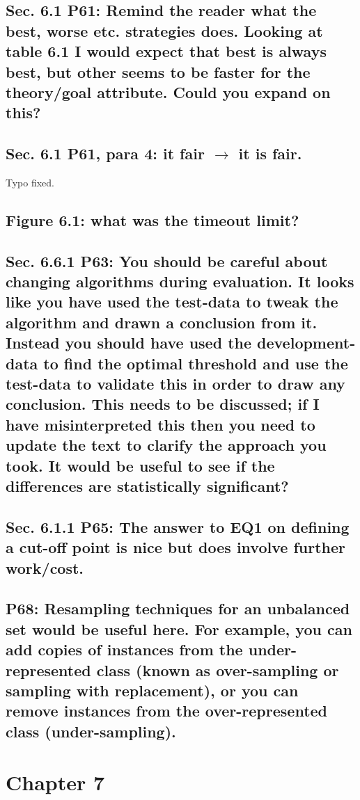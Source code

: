 \documentclass[]{article}
\begin{document}
\subsection{Sec. 6.1 P61: Remind the reader what the best, worse etc. strategies does. Looking at table 6.1 I would expect that best is always best, but other seems to be faster for the theory/goal attribute. Could you expand on this?}

\subsection{Sec. 6.1 P61, para 4: it fair $\rightarrow$ it is fair.}

Typo fixed.

\subsection{Figure 6.1: what was the timeout limit?}

\subsection{Sec. 6.6.1 P63: You should be careful about changing algorithms during evaluation. It looks like you have used the test-data to tweak the algorithm and drawn a conclusion from it. Instead you should have used the development-data to find the optimal threshold and use the test-data to validate this in order to draw any conclusion. This needs to be discussed; if I have	misinterpreted this then you need to update the text to clarify the approach you took. It would be useful to see if the differences are statistically significant?}

\subsection{Sec. 6.1.1 P65: The answer to EQ1 on defining a cut-off point is nice but does involve further work/cost.}

\subsection{P68: Resampling techniques for an unbalanced set would be useful here. For example, you can add copies of instances from the under-represented class (known as over-sampling or sampling with replacement), or you can remove instances from the over-represented class (under-sampling).}

\section{Chapter 7}
\end{document}
